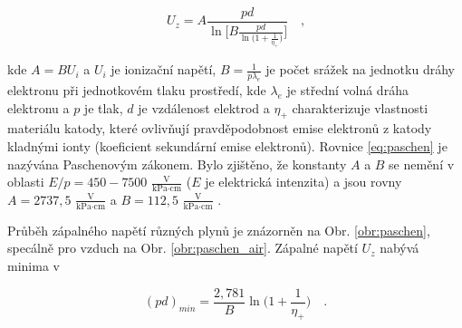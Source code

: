 \begin{equation} 
U_z=A \frac{pd}{\ln \Big[ B \frac{pd}{\ln \big( 1+ \frac{1}{\eta_+} \big)} \Big]} \quad \text{,}
\label{eq:paschen}
\end{equation}

kde $A=BU_i$ a $U_i$ je ionizační napětí, $B=\frac{1}{p\lambda_e}$ je počet srážek na jednotku dráhy elektronu při jednotkovém tlaku prostředí, kde $\lambda_e$ je střední volná dráha elektronu a $p$ je tlak, $d$ je vzdálenost elektrod a $\eta_+$ charakterizuje vlastnosti materiálu katody, které ovlivňují pravděpodobnost emise elektronů z katody kladnými ionty (koeficient sekundární emise elektronů). Rovnice \eqref{eq:paschen} je nazývána Paschenovým zákonem. Bylo zjištěno, že konstanty $A$ a $B$ se nemění v oblasti $E/p=450-7500$ $\frac{\text{V}}{\text{kPa} \cdot \text{cm}}$ ($E$ je elektrická intenzita) a jsou rovny $A=2737,5$ $\frac{\text{V}}{\text{kPa} \cdot \text{cm}}$ a $B=112,5$ $\frac{\text{V}}{\text{kPa} \cdot \text{cm}}$ \cite{Husain1982}.
\par Průběh zápalného napětí různých plynů je znázorněn na Obr. \ref{obr:paschen}, specálně pro vzduch na Obr. \ref{obr:paschen_air}. Zápalné napětí $U_z$ nabývá minima v \cite{kracik}

\begin{equation}
(pd)_{min}=\frac{2,781}{B} \ln \Big( 1+ \frac{1}{\eta_+} \Big) \quad \text{.}
\end{equation}


